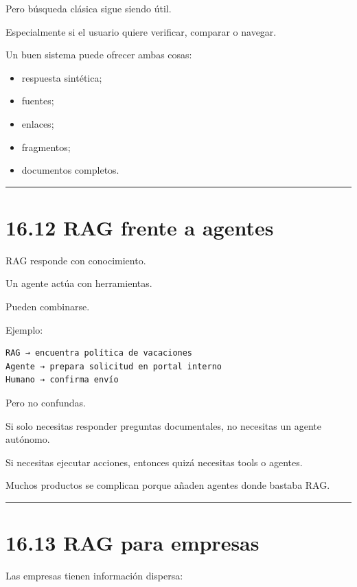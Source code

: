 Pero búsqueda clásica sigue siendo útil.

Especialmente si el usuario quiere verificar, comparar o navegar.

Un buen sistema puede ofrecer ambas cosas:

\begin{itemize}
\tightlist
\item
  respuesta sintética;
\item
  fuentes;
\item
  enlaces;
\item
  fragmentos;
\item
  documentos completos.
\end{itemize}

\begin{center}\rule{0.5\linewidth}{0.5pt}\end{center}

\section{16.12 RAG frente a agentes}\label{rag-frente-a-agentes}

RAG responde con conocimiento.

Un agente actúa con herramientas.

Pueden combinarse.

Ejemplo:

\begin{lstlisting}
RAG → encuentra política de vacaciones
Agente → prepara solicitud en portal interno
Humano → confirma envío
\end{lstlisting}

Pero no confundas.

Si solo necesitas responder preguntas documentales, no necesitas un
agente autónomo.

Si necesitas ejecutar acciones, entonces quizá necesitas tools o
agentes.

Muchos productos se complican porque añaden agentes donde bastaba RAG.

\begin{center}\rule{0.5\linewidth}{0.5pt}\end{center}

\section{16.13 RAG para empresas}\label{rag-para-empresas}

Las empresas tienen información dispersa:

